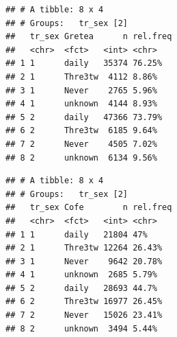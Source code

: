 \documentclass[]{article}
\newenvironment{Shaded}{\begin{snugshade}}{\end{snugshade}}
\newcommand{\DataTypeTok}[1]{\textcolor[rgb]{0.13,0.29,0.53}{#1}}
\newcommand{\DecValTok}[1]{\textcolor[rgb]{0.00,0.00,0.81}{#1}}
\newcommand{\KeywordTok}[1]{\textcolor[rgb]{0.13,0.29,0.53}{\textbf{#1}}}
\newcommand{\NormalTok}[1]{#1}
\newcommand{\OperatorTok}[1]{\textcolor[rgb]{0.81,0.36,0.00}{\textbf{#1}}}
\newcommand{\OtherTok}[1]{\textcolor[rgb]{0.56,0.35,0.01}{#1}}
\newcommand{\StringTok}[1]{\textcolor[rgb]{0.31,0.60,0.02}{#1}}
\begin{document}
\begin{verbatim}
## # A tibble: 8 x 4
## # Groups:   tr_sex [2]
##   tr_sex Gretea      n rel.freq
##   <chr>  <fct>   <int> <chr>   
## 1 1      daily   35374 76.25%  
## 2 1      Thre3tw  4112 8.86%   
## 3 1      Never    2765 5.96%   
## 4 1      unknown  4144 8.93%   
## 5 2      daily   47366 73.79%  
## 6 2      Thre3tw  6185 9.64%   
## 7 2      Never    4505 7.02%   
## 8 2      unknown  6134 9.56%
\end{verbatim}

\begin{Shaded}
\end{Shaded}

\begin{verbatim}
## # A tibble: 8 x 4
## # Groups:   tr_sex [2]
##   tr_sex Cofe        n rel.freq
##   <chr>  <fct>   <int> <chr>   
## 1 1      daily   21804 47%     
## 2 1      Thre3tw 12264 26.43%  
## 3 1      Never    9642 20.78%  
## 4 1      unknown  2685 5.79%   
## 5 2      daily   28693 44.7%   
## 6 2      Thre3tw 16977 26.45%  
## 7 2      Never   15026 23.41%  
## 8 2      unknown  3494 5.44%
\end{verbatim}

\begin{Shaded}
\end{Shaded}
\end{document}
